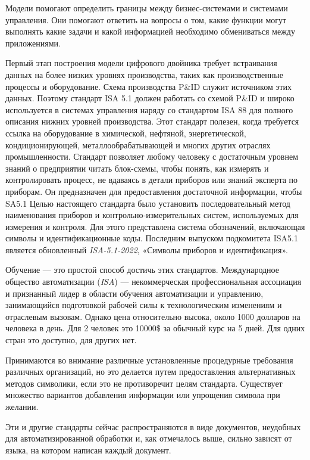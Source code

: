 Модели помогают определить границы между бизнес-системами и системами управления. Они помогают ответить на вопросы о том, какие функции могут выполнять какие задачи и какой информацией необходимо обмениваться между приложениями.

Первый этап построения модели цифрового двойника требует встраивания данных на более низких уровнях производства, таких как производственные процессы и оборудование. Схема производства P\&ID служит источником этих данных. Поэтому стандарт ISA 5.1 \cite{ISA_5_1} должен работать со схемой P\&ID и широко используется в системах управления наряду со стандартом ISA 88 для полного описания нижних уровней производства. Этот стандарт полезен, когда требуется ссылка на оборудование в химической, нефтяной, энергетической, кондиционирующей, металлообрабатывающей и многих других отраслях промышленности. Стандарт позволяет любому человеку с достаточным уровнем знаний о предприятии читать блок-схемы, чтобы понять, как измерять и контролировать процесс, не вдаваясь в детали приборов или знаний эксперта по приборам. Он предназначен для предоставления достаточной информации, чтобы SA5.1 Целью настоящего стандарта было установить последовательный метод наименования приборов и контрольно-измерительных систем, используемых для измерения и контроля. Для этого представлена система обозначений, включающая символы и идентификационные коды. Последним выпуском подкомитета ISA5.1 является обновленный \textit {ISA-5.1-2022}, «Символы приборов и идентификация».

Обучение — это простой способ достичь этих стандартов. Международное общество автоматизации (\textit {ISA}) — некоммерческая профессиональная ассоциация и признанный лидер в области обучения автоматизации и управлению, занимающийся подготовкой рабочей силы к технологическим изменениям и отраслевым вызовам. Однако цена относительно высока, около 1000 долларов на человека в день. Для 2 человек это 10000\$ за обычный курс на 5 дней. Для одних стран это доступно, для других нет.

Принимаются во внимание различные установленные процедурные требования различных организаций, но это делается путем предоставления альтернативных методов символики, если это не противоречит целям стандарта. Существует множество вариантов добавления информации или упрощения символа при желании.

Эти и другие стандарты сейчас распространяются в виде документов, неудобных для автоматизированной обработки и, как отмечалось выше, сильно зависят от языка, на котором написан каждый документ.

